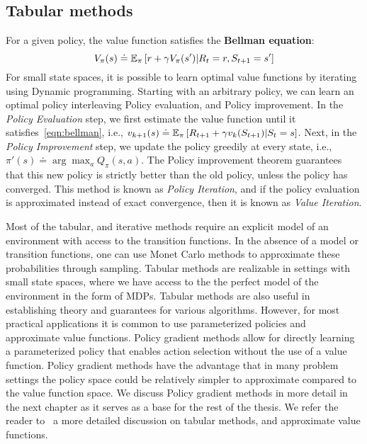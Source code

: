 \subsection{Tabular methods}
For a given policy, the value function satisfies the \textbf{Bellman equation}:
\begin{equation}
	\label{eqn:bellman} V_\pi(s) \doteq \mathbb{E}_\pi \left[r + \gamma V_\pi(s') | R_t = r, S_{t+1} = s'
		\right]
\end{equation} For small state spaces, it is possible to learn optimal value functions by
iterating using Dynamic programming.
Starting with an arbitrary policy, we can learn an optimal policy interleaving Policy evaluation,
and Policy improvement.
In the \textit{Policy Evaluation} step, we first estimate the value function until it
satisfies~\ref{eqn:bellman}, i.e., $v_{k+1}(s) \doteq \mathbb{E}_\pi \left[R_{t+1} + \gamma v_k(S_{t+1})
		|S_t =s\right]$.
Next, in the \textit{Policy Improvement} step, we update the policy greedily at every state, i.e.,
$\pi'(s) \doteq \arg \max_{a} Q_\pi(s,a)$.
The Policy improvement theorem guarantees that this new policy is strictly better than the old
policy, unless the policy has converged.
This method is known as \textit{Policy Iteration}, and if the policy evaluation is approximated
instead of exact convergence, then it is known as \textit{Value Iteration}.

Most of the tabular, and iterative methods require an explicit model of an environment with access
to the transition functions.
In the absence of a model or transition functions, one can use Monet Carlo methods to approximate
these probabilities through sampling.
Tabular methods are realizable in settings with small state spaces, where we have access to the
the perfect model of the environment in the form of MDPs.
Tabular methods are also useful in establishing theory and guarantees for various algorithms.
However, for most practical applications it is common to use parameterized policies and approximate
value functions.
Policy gradient methods allow for directly learning a parameterized policy that enables action
selection without the use of a value function.
Policy gradient methods have the advantage that in many problem settings the policy space could be
relatively simpler to approximate compared to the value function space.
We discuss Policy gradient methods in more detail in the next chapter as it serves as a base for
the rest of the thesis.
We refer the reader to~\cite{suttonReinforcement2018} a more detailed discussion on tabular
methods, and approximate value functions.

